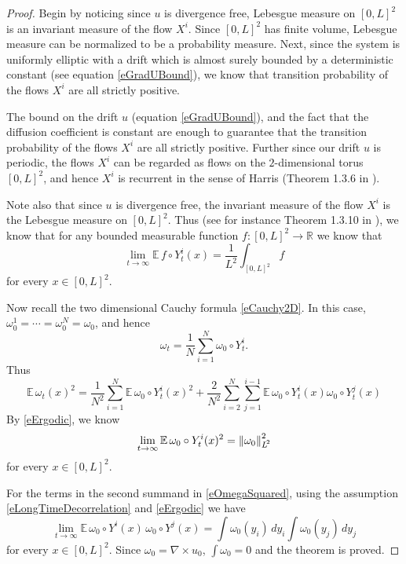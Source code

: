 \documentclass[final]{amsart}%
\newcommand{\grad}{\nabla}
\newcommand{\curl}{\grad \times}
\newcommand{\E}{\mathbb{E}}
\newcommand{\R}{\mathbb{R}}
\newif\iftextstyle
\newcommand{\norm}[1]{\iftextstyle\lVert#1\rVert\else\left\lVert#1\right\rVert\fi}
\newcommand{\lpnorm}[2]{\norm{#1}_{\smash{L^{\!#2}_{\vphantom{h}}}\vphantom{L^{\!#2}}}}
\numberwithin{equation}{section}
\theoremstyle{definition}
\theoremstyle{remark}
\begin{document}
\begin{proof}%

  Begin by noticing since $u$ is divergence free, Lebesgue measure on
  $[0,L]^2$ is an invariant measure of the flow $X^i$. Since $[0,L]^2$
  has finite volume,  Lebesgue measure can be normalized to be a
  probability measure. Next, since the system is uniformly elliptic
  with a drift which is almost surely bounded by a deterministic
  constant (see equation \eqref{eGradUBound}), we know that  transition probability of the flows $X^i$ are all
  strictly positive.


  The bound on the drift $u$ (equation \eqref{eGradUBound}), and the
  fact that the diffusion coefficient is constant are enough to
  guarantee that the transition probability of the flows $X^i$ are all
  strictly positive. Further since our drift $u$ is periodic, the
  flows $X^i$ can be regarded as flows on the $2$-dimensional torus
  $[0,L]^2$, and hence $X^i$ is recurrent in the sense of Harris
  (Theorem 1.3.6 in \cite{kunita}).

  Note also that since $u$ is divergence free, the invariant measure
  of the flow $X^i$ is the Lebesgue measure on $[0,L]^2$. Thus (see
  for instance Theorem 1.3.10 in \cite{kunita}), we know that for any
  bounded measurable function $f:[0,L]^2 \to \R$ we know that
\begin{equation}\label{eErgodic}
  \lim_{t \to \infty} \E\,f\circ Y^i_t(x) = \frac{1}{L^2} \int_{[0,L]^2} f
\end{equation}
for every $x \in [0,L]^2$.\medskip

Now recall the two dimensional Cauchy formula \eqref{eCauchy2D}. In
this case, $\omega^1_0 = \cdots = \omega^N_0 = \omega_0$, and hence
$$
\omega_t = \frac{1}{N} \sum_{i=1}^N \omega_0 \circ Y^i_t.
$$
Thus
\begin{equation}\label{eOmegaSquared}
  \E\,\omega_t(x)^2 = \frac{1}{N^2} \sum_{i=1}^N \E\,\omega_0 \circ
  Y^i_t (x)^2 + \frac{2}{N^2} \sum_{i=2}^N \sum_{j = 1}^{i-1} \E\,
  \omega_0 \circ Y^i_t(x) \omega_0 \circ Y^j_t(x) 
\end{equation}
By \eqref{eErgodic}, we know
\begin{equation*}
  \lim_{t\to\infty} \E\, \omega_0 \circ Y^i_t(x)^2 = \lpnorm{\omega_0}{2}^2
\end{equation*}
for every $x \in [0,L]^2$.

For the terms in the second summand in \eqref{eOmegaSquared}, using
the assumption \eqref{eLongTimeDecorrelation} and \eqref{eErgodic} we
have
$$
\lim_{t \to \infty} \E\, \omega_0 \circ Y^i (x) \, \omega_0 \circ Y^j(x)
= \int \omega_0(y_i) \, dy_i \int \omega_0(y_j) \, dy_j
$$
for every $x \in [0,L]^2$. Since $\omega_0 = \curl u_0$, $\int
\omega_0 = 0$ and the theorem is proved.
\end{proof}%
\end{document}
